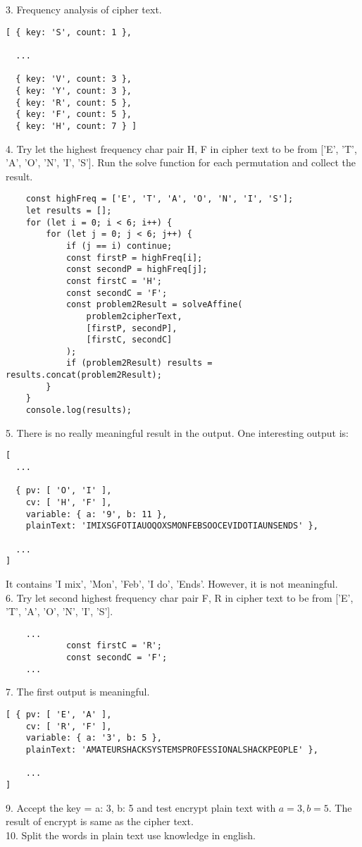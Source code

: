 \documentclass[paper=a4, fontsize=11pt]{scrartcl} %
\numberwithin{equation}{section} %
\numberwithin{figure}{section} %
\begin{document}
3. Frequency analysis of cipher text.\\
\begin{lstlisting}
[ { key: 'S', count: 1 },

  ...

  { key: 'V', count: 3 },
  { key: 'Y', count: 3 },
  { key: 'R', count: 5 },
  { key: 'F', count: 5 },
  { key: 'H', count: 7 } ]
\end{lstlisting}
4. Try let the highest frequency char pair H, F in cipher text to be from ['E', 'T', 'A', 'O', 'N', 'I', 'S']. Run the solve function for each permutation and collect the result.\\
\begin{lstlisting}
    const highFreq = ['E', 'T', 'A', 'O', 'N', 'I', 'S'];
    let results = [];
    for (let i = 0; i < 6; i++) {
        for (let j = 0; j < 6; j++) {
            if (j == i) continue;
            const firstP = highFreq[i];
            const secondP = highFreq[j];
            const firstC = 'H';
            const secondC = 'F';
            const problem2Result = solveAffine(
                problem2cipherText,
                [firstP, secondP],
                [firstC, secondC]
            );
            if (problem2Result) results = results.concat(problem2Result);
        }
    }
    console.log(results);
\end{lstlisting}
5. There is no really meaningful result in the output. One interesting output is:\\
\begin{lstlisting}
[
  ...

  { pv: [ 'O', 'I' ],
    cv: [ 'H', 'F' ],
    variable: { a: '9', b: 11 },
    plainText: 'IMIXSGFOTIAUOQOXSMONFEBSOOCEVIDOTIAUNSENDS' },
  
  ...
]
\end{lstlisting}
It contains 'I mix', 'Mon', 'Feb', 'I do', 'Ends'. However, it is not meaningful.\\

6. Try let second highest frequency char pair F, R in cipher text to be from ['E', 'T', 'A', 'O', 'N', 'I', 'S'].\\
\begin{lstlisting}
    ...
            const firstC = 'R';
            const secondC = 'F';
    ...
\end{lstlisting}
7. The first output is meaningful.\\
\begin{lstlisting}
[ { pv: [ 'E', 'A' ],
    cv: [ 'R', 'F' ],
    variable: { a: '3', b: 5 },
    plainText: 'AMATEURSHACKSYSTEMSPROFESSIONALSHACKPEOPLE' },

    ...
]
\end{lstlisting}
9. Accept the key = { a: 3, b: 5 } and test encrypt plain text with $a=3, b=5$. The result of encrypt is same as the cipher text.\\
10. Split the words in plain text use knowledge in english.\\
\end{document}
